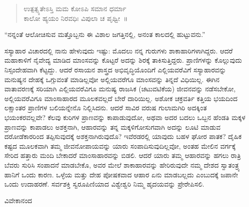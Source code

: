 \begin{verse}
 ಉತ್ಪತ್ಸ್ಯತೇಽಸ್ತಿ ಮಮ ಕೋಽಪಿ ಸಮಾನ ಧರ್ಮಾ\\
 ಕಾಲೋ ಹ್ಯಯಂ ನಿರವಧಿಃ ವಿಪುಲಾ ಚ ಪೃಥ್ವೀ~॥  
\end{verse}



“ನನ್ನಂತೆ ಆಲೋಚಿಸುವ ಮತ್ತೊಬ್ಬನು ಈ ವಿಶಾಲ ಜಗತ್ತಿನಲ್ಲಿ, ಅನಂತ ಕಾಲದಲ್ಲಿ ಹುಟ್ಟುವನು.”

ಸಸ್ಯಾಹಾರ ವಿಚಾರದಲ್ಲಿ ನಾನು ಹೇಳುವುದು ಇಷ್ಟು: ಮೊದಲು ನನ್ನ ಗುರುಗಳು ಶಾಕಾಹಾರಿಗಳಾಗಿದ್ದರು. ಆದರೆ ಮಹಾಕಾಳಿಗೆ ನೈವೇದ್ಯ ಮಾಡಿದ ಮಾಂಸವನ್ನು ಕೊಟ್ಟರೆ ಅದನ್ನು ಶಿರಕ್ಕೆ ತಾಕಿಸುತ್ತಿದ್ದರು. ಪ್ರಾಣಿಗಳನ್ನು ಕೊಲ್ಲುವುದು ನಿಸ್ಸಂದೇಹವಾಗಿ ಕೆಟ್ಟದ್ದು. ಆದರೆ ರಸಾಯನ ಶಾಸ್ತ್ರದ ಅಭಿವೃದ್ಧಿಯೊಂದಿಗೆ ಎಲ್ಲಿಯವರೆವಿಗೆ ಸಸ್ಯಾಹಾರವನ್ನು ಮನುಷ್ಯನ ದೇಹಕ್ಕೆ ಒಗ್ಗುವಂತೆ ಮಾಡಿಲ್ಲವೋ ಅಲ್ಲಿಯವರೆಗೂ ಮಾಂಸವನ್ನು ತಿನ್ನದೆ ವಿಧಿಯಿಲ್ಲ. ಈಗಿನ ವಾತಾವರಣಕ್ಕೆ ಸರಿಯಾಗಿ ಎಲ್ಲಿಯವರೆವಿಗೂ ಮನುಷ್ಯ ರಾಜಸಿಕ (ಚಟುವಟಿಕೆಯ) ಜೀವನವನ್ನು ನಡೆಸಬೇಕೋ, ಅಲ್ಲಿಯವರೆವಿಗೂ ಮಾಂಸಾಹಾರದ ಮೂಲಕವಲ್ಲದೆ ಬೇರೆ ದಾರಿಯಿಲ್ಲ. ಅಶೋಕ ಚಕ್ರವರ್ತಿ ಕತ್ತಿಯ ಭಯದಿಂದ ಲಕ್ಷಾಂತರ ಪ್ರಾಣಿಗಳ ಬಲಿಯನ್ನೇನೊ ನಿಲ್ಲಿಸಿದನು. ಆದರೆ ಸಾವಿರ ವರುಷ ಗುಲಾಮಗಿರಿ ಅದಕ್ಕಿಂತ ಭಯಂಕರವಲ್ಲವೇ? ಕೆಲವು ಕುರಿಗಳ ಪ್ರಾಣವನ್ನು ಕಾಪಾಡುವುದೋ, ಅಥವಾ ಅದರ ಬದಲು ಒಬ್ಬನ ಹೆಂಡತಿ ಮಕ್ಕಳ ಪ್ರಾಣವನ್ನು ಕಾಪಾಡಲು ಅಶಕ್ತನಾಗಿ, ಆಹಾರವನ್ನು ತನ್ನ ಮಕ್ಕಳಿಗೋಸುಗವಾಗಿ ಅದನ್ನು ಲೂಟಿ ಮಾಡುವ ದರೋಡೆಕಾರರಿಂದ ತಪ್ಪಿಸುವುದಕ್ಕೆ ಅಶಕ್ತನಾಗಿರುವುದೊ? ಇವೆರಡರಲ್ಲಿ ಯಾವುದು ಬಹಳ ಘೋರ ಪಾತಕ? ದೈಹಿಕ ಕಷ್ಟದ ಮೂಲಕವಾಗಿ ತಮ್ಮ ಜೀವನೋಪಾಯವನ್ನು ಯಾರು ಸಂಪಾದಿಸುವುದಿಲ್ಲವೋ, ಅಂತಹ ಮೇಲಿನ ವರ್ಗಕ್ಕೆ ಸೇರಿದ ಹತ್ತಾರು ಮಂದಿ ಬೇಕಾದರೆ ಮಾಂಸಾಹಾರವನ್ನು ಬಿಡಲಿ. ಆದರೆ ಯಾರು ತಮ್ಮ ಆಹಾರವನ್ನು ಹಗಲು ರಾತ್ರಿ ಬೆವರು ಸುರಿಸಿ ಸಂಪಾದನೆ ಮಾಡಬೇಕೊ, ಅವರ ಮೇಲೆ ಶಾಕಾಹಾರವನ್ನು ಹೇರಿರುವುದೇ ನಮ್ಮ ದೇಶದ ಸ್ವಾತಂತ್ರ್ಯ ಹಾನಿಗೆ ಒಂದು ಕಾರಣ. ಒಳ್ಳೆಯ ಮತ್ತು ದೇಹ ಪೋಷಕವಾದ ಆಹಾರ ಏನು ಮಾಡಬಲ್ಲದು ಎಂಬುದಕ್ಕೆ ಜಪಾನೇ ಒಂದು ಉದಾಹರಣೆ. ಸರ್ವಶಕ್ತಿ ಸ್ವರೂಪಿಣಿಯಾದ ವಿಶ್ವೇಶ್ವರಿ ನಿಮ್ಮ ಹೃದಯವನ್ನು ಪ್ರೇರೇಪಿಸಲಿ.

\begin{flushright}
ವಿವೇಕಾನಂದ
\end{flushright}

\relax
